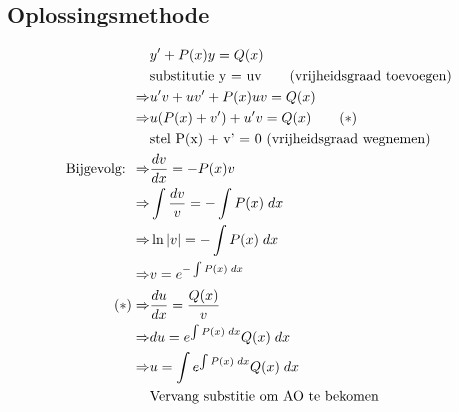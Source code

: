 \subsection{Oplossingsmethode}
\begin{equation*}
 \begin{split}
  & y' + P(x)y = Q(x) \\
  & \hbox{substitutie y = uv} \qquad \hbox{(vrijheidsgraad toevoegen)}\\
  \Rightarrow & u'v + uv' + P(x)uv = Q(x) \\
  \Rightarrow & u(P(x) + v') + u'v = Q(x) \qquad (*) \\
  & \hbox{stel P(x) + v' = 0 (vrijheidsgraad wegnemen)} \\
  \hbox{Bijgevolg: } \Rightarrow & \frac{dv}{dx} = - P(x)v \\
    \Rightarrow & \int \frac{dv}{v} = - \int P(x)\; dx \\
    \Rightarrow & \ln|v| = - \int P(x)\; dx \\
    \Rightarrow & v  = e^{-\int P(x)\; dx} \\
    (*)\Rightarrow & \frac{du}{dx} = \frac{Q(x)}{v} \\
    \Rightarrow & du = e^{\int P(x)\;dx}Q(x) \; dx \\
    \Rightarrow & u = \int e^{\int P(x)\;dx}Q(x) \; dx \\
    & \hbox{Vervang substitie om AO te bekomen}
 \end{split}
\end{equation*}

